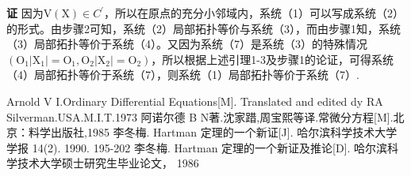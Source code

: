 \documentclass[12pt,a4paper,UTF8]{ctexart}
\begin{document}
\textbf{证 }因为$\mathrm{V}(\mathrm{X})\in C^{\prime}$，所以在原点的充分小邻域内，系统（1）可以写成系统（2）的形式。由步骤2可知，系统（2）局部拓扑等价与系统（3），而由步骤1知，系统（3）局部拓扑等价于系统（4）。又因为系统（7）是系统（3）的特殊情况$\left(\mathrm{O}_1\left|\mathrm{X}_1\right|=\mathrm{O}_1, \mathrm{O}_2\left|\mathrm{X}_2\right|=\mathrm{O}_2\right)$，所以根据上述引理1-3及步骤1的论证，可得系统（4）局部拓扑等价于系统（7），则系统（1）局部拓扑等价于系统（7）.











\newpage %
{} %

\begin{thebibliography}{99}


Arnold V I.Ordinary Differential Equations[M]. Translated and edited dy RA Silverman.USA.M.I.T.1973
阿诺尔德 B N著.沈家踖,周宝熙等译.常微分方程[M].北京：料学出版社,1985
李冬梅. Hartman 定理的一个新证[J]. 哈尔滨科学技术大学学报 14(2). 1990.  195-202
李冬梅. Hartman 定理的一个新证及推论[D]. 哈尔滨科学技术大学硕士研究生毕业论文， 1986

\end{thebibliography}
\end{document}
